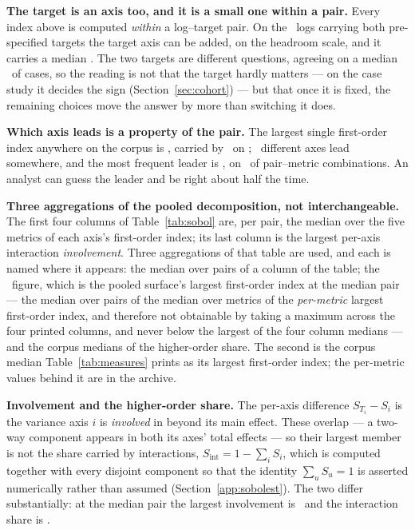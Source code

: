 \textbf{The target is an axis too, and it is a small one within a pair.} Every
index above is computed \emph{within} a log--target pair. On the
\nLogsBothTargets\ logs carrying both pre-specified targets the target axis can
be added, on the headroom scale, and it carries a median \sobolTargetPct. The
two targets are different questions, agreeing on a median \targetAgreement\ of
cases, so the reading is not that the target hardly matters --- on the case
study it decides the sign (Section~\ref{sec:cohort}) --- but that once it is
fixed, the remaining choices move the answer by more than switching it does.

\textbf{Which axis leads is a property of the pair.} The largest single
first-order index anywhere on the corpus is \topIndexPct, carried by
\topIndexAxis\ on \topIndexPair; \nAxesLeading\ different axes lead somewhere,
and the most frequent leader is \modalLeadingAxis, on
\modalLeadingSharePct\ of pair--metric combinations. An analyst can guess
the leader and be right about half the time.

\textbf{Three aggregations of the pooled decomposition, not interchangeable.}
The first four columns of Table~\ref{tab:sobol} are, per pair, the median
over the five metrics of each axis's first-order index; its last column is
the largest per-axis interaction \emph{involvement}. Three aggregations of
that table are used, and each is named where it appears: the median over
pairs of a column of the table; the \largestFirstOrderPct\ figure, which is
the pooled surface's largest first-order index at the median pair --- the
median over pairs of the median over metrics of the \emph{per-metric} largest
first-order index, and therefore not obtainable by taking a maximum across
the four printed columns, and never below the largest of the four column
medians --- and the corpus medians of the higher-order share. The second is
the corpus median Table~\ref{tab:measures} prints as its largest first-order
index; the per-metric values behind it are in the archive.

\textbf{Involvement and the higher-order share.} The per-axis difference
$S_{T_i} - S_i$ is the variance axis $i$ is \emph{involved} in beyond its
main effect. These overlap --- a two-way component appears in both its axes'
total effects --- so their largest member is not the share carried by
interactions, $S_{\mathrm{int}} = 1 - \sum_i S_i$, which is computed together
with every disjoint component so that the identity $\sum_u S_u = 1$ is
asserted numerically rather than assumed (Section~\ref{app:sobolest}). The
two differ substantially: at the median pair the largest involvement is
\largestInvolvementPct\ and the interaction share is \interactionTotalPct.

